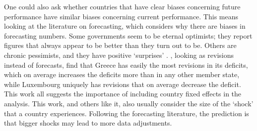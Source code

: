 \documentclass[]{article}
\begin{document}
One could also ask whether countries that have clear biases concerning future performance have similar biases concerning current performance. This means looking at the literature on forecasting, which  considers why there are biases in forecasting numbers. Some governments seem to be eternal optimists; they report figures that always appear to be better than they turn out to be. Others are chronic pessimists, and they have positive `surprises' \citep[e.g.][]{Strauchetal2004}. \cite{DeCastro2013}, looking as revisions instead of forecasts, find that Greece has easily the most revisions in its deficits, which on average increases the deficits more than in any other member state, while Luxembourg uniquely has revisions that on average decrease the deficit. This work all suggests the importance of including country fixed effects in the analysis.  This work, and others like it, also usually consider the size of the `shock' that a country experiences. Following the forecasting literature, the prediction is that bigger shocks may lead to more data adjustments.

\end{document}
